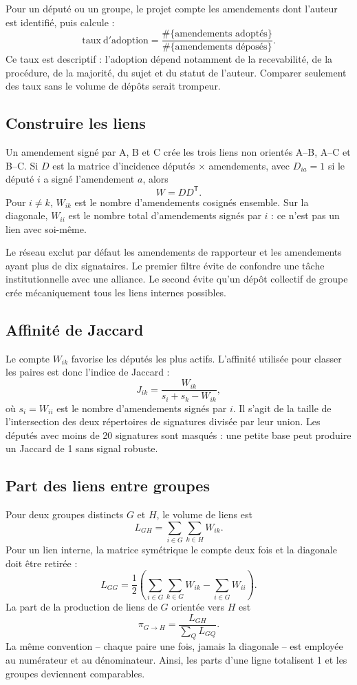 \documentclass[11pt,a4paper]{article}
\begin{document}
Pour un député ou un groupe, le projet compte les amendements dont l'auteur est
identifié, puis calcule :
\[
 \mathrm{taux\ d'adoption}=\frac{\#\{\text{amendements adoptés}\}}
 {\#\{\text{amendements déposés}\}}.
\]
Ce taux est descriptif : l'adoption dépend notamment de la recevabilité, de la
procédure, de la majorité, du sujet et du statut de l'auteur. Comparer seulement
des taux sans le volume de dépôts serait trompeur.

\subsection{Construire les liens}

Un amendement signé par A, B et C crée les trois liens non orientés A--B,
A--C et B--C. Si $D$ est la matrice d'incidence députés $\times$ amendements,
avec $D_{ia}=1$ si le député $i$ a signé l'amendement $a$, alors
\[
 W=DD^{\mathsf T}.
\]
Pour $i\neq k$, $W_{ik}$ est le nombre d'amendements cosignés ensemble. Sur la
diagonale, $W_{ii}$ est le nombre total d'amendements signés par $i$ : ce n'est
pas un lien avec soi-même.

Le réseau exclut par défaut les amendements de rapporteur et les amendements
ayant plus de dix signataires. Le premier filtre évite de confondre une tâche
institutionnelle avec une alliance. Le second évite qu'un dépôt collectif de
groupe crée mécaniquement tous les liens internes possibles.

\subsection{Affinité de Jaccard}

Le compte $W_{ik}$ favorise les députés les plus actifs. L'affinité utilisée
pour classer les paires est donc l'indice de Jaccard :
\[
 J_{ik}=\frac{W_{ik}}{s_i+s_k-W_{ik}},
\]
où $s_i=W_{ii}$ est le nombre d'amendements signés par $i$. Il s'agit de la
taille de l'intersection des deux répertoires de signatures divisée par leur
union. Les députés avec moins de 20 signatures sont masqués : une petite base
peut produire un Jaccard de 1 sans signal robuste.

\subsection{Part des liens entre groupes}

Pour deux groupes distincts $G$ et $H$, le volume de liens est
\[
 L_{GH}=\sum_{i\in G}\sum_{k\in H}W_{ik}.
\]
Pour un lien interne, la matrice symétrique le compte deux fois et la diagonale
doit être retirée :
\[
 L_{GG}=\frac{1}{2}\left(\sum_{i\in G}\sum_{k\in G}W_{ik}
 -\sum_{i\in G}W_{ii}\right).
\]
La part de la production de liens de $G$ orientée vers $H$ est
\[
 \pi_{G\to H}=\frac{L_{GH}}{\sum_Q L_{GQ}}.
\]
La même convention -- chaque paire une fois, jamais la diagonale -- est
employée au numérateur et au dénominateur. Ainsi, les parts d'une ligne totalisent
1 et les groupes deviennent comparables.
\end{document}
